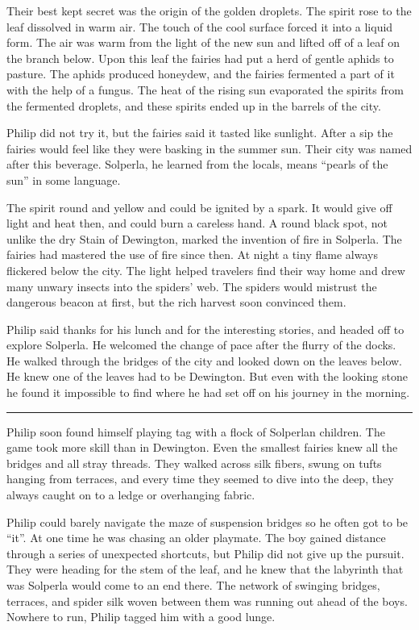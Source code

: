 \documentclass[10pt, draft]{memoir}
\renewcommand{\pfbreakdisplay}{\bigskip \ding{166} \bigskip}
\newcommand{\secbreak}{\fancybreak{\pfbreakdisplay}}
\begin{document}
Their best kept secret was the origin of the golden droplets. The spirit rose
to the leaf dissolved in warm air. The touch of the cool surface forced it into
a liquid form. The air was warm from the light of the new sun and lifted off of
a leaf on the branch below. Upon this leaf the fairies had put a herd of gentle
aphids to pasture. The aphids produced honeydew, and the fairies fermented a
part of it with the help of a fungus. The heat of the rising sun evaporated the
spirits from the fermented droplets, and these spirits ended up in the barrels
of the city.

Philip did not try it, but the fairies said it tasted like sunlight. After a
sip the fairies would feel like they were basking in the summer sun. Their city
was named after this beverage. Solperla, he learned from the locals, means
``pearls of the sun'' in some language.

The spirit round and yellow and could be ignited by a spark. It would give off
light and heat then, and could burn a careless hand. A round black spot, not
unlike the dry Stain of Dewington, marked the invention of fire in Solperla.
The fairies had mastered the use of fire since then. At night a tiny flame
always flickered below the city. The light helped travelers find their way home
and drew many unwary insects into the spiders' web. The spiders would mistrust
the dangerous beacon at first, but the rich harvest soon convinced them.

Philip said thanks for his lunch and for the interesting stories, and headed
off to explore Solperla. He welcomed the change of pace after the flurry of the
docks. He walked through the bridges of the city and looked down on the leaves
below. He knew one of the leaves had to be Dewington. But even with the looking
stone he found it impossible to find where he had set off on his journey in the
morning.

\secbreak

Philip soon found himself playing tag with a flock of Solperlan children. The
game took more skill than in Dewington. Even the smallest fairies knew all the
bridges and all stray threads. They walked across silk fibers, swung on tufts
hanging from terraces, and every time they seemed to dive into the deep, they
always caught on to a ledge or overhanging fabric.

Philip could barely navigate the maze of suspension bridges so he often got to
be ``it''. At one time he was chasing an older playmate. The boy gained
distance through a series of unexpected shortcuts, but Philip did not give up
the pursuit. They were heading for the stem of the leaf, and he knew that the
labyrinth that was Solperla would come to an end there. The network of swinging
bridges, terraces, and spider silk woven between them was running out ahead of
the boys. Nowhere to run, Philip tagged him with a good lunge.
\end{document}
